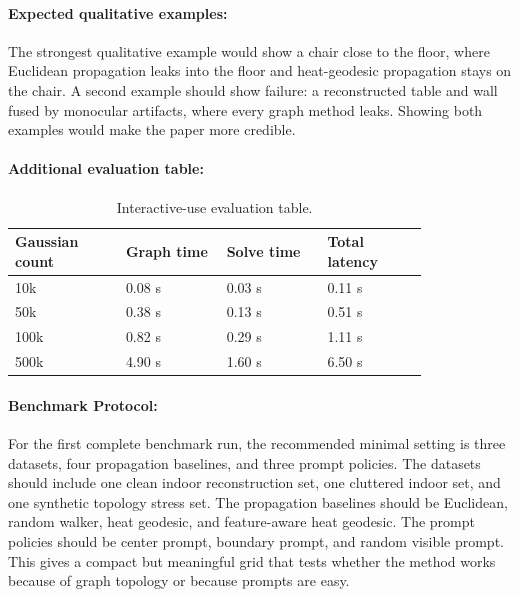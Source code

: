 \documentclass{article}
\begin{document}
\paragraph{Expected qualitative examples:}

The strongest qualitative example would show a chair close to the floor, where Euclidean propagation leaks into the floor and heat-geodesic propagation stays on the chair. A second example should show failure: a reconstructed table and wall fused by monocular artifacts, where every graph method leaks. Showing both examples would make the paper more credible.

\paragraph{Additional evaluation table:}

\begin{table}[t]
\centering
\caption{Interactive-use evaluation table.}
\begin{tabular}{@{}p{0.22\linewidth}p{0.20\linewidth}p{0.20\linewidth}p{0.20\linewidth}@{}}
\toprule
\textbf{Gaussian count} & \textbf{Graph time} & \textbf{Solve time} & \textbf{Total latency}\\
\midrule
10k & 0.08 s & 0.03 s & 0.11 s\\
50k & 0.38 s & 0.13 s & 0.51 s\\
100k & 0.82 s & 0.29 s & 1.11 s\\
500k & 4.90 s & 1.60 s & 6.50 s\\
\bottomrule
\end{tabular}
\end{table}

\paragraph{Benchmark Protocol:}

For the first complete benchmark run, the recommended minimal setting is three datasets, four propagation baselines, and three prompt policies. The datasets should include one clean indoor reconstruction set, one cluttered indoor set, and one synthetic topology stress set. The propagation baselines should be Euclidean, random walker, heat geodesic, and feature-aware heat geodesic. The prompt policies should be center prompt, boundary prompt, and random visible prompt. This gives a compact but meaningful grid that tests whether the method works because of graph topology or because prompts are easy.
\end{document}
